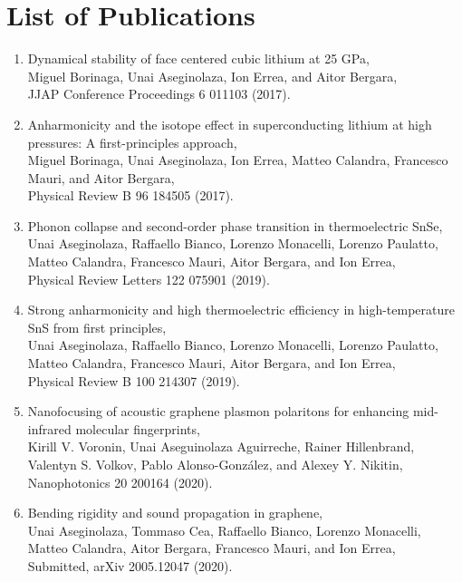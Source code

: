 
\chapter*{List of Publications} %

\begin{enumerate}
\item Dynamical stability of face centered cubic lithium at 25 GPa, \\
Miguel Borinaga, Unai Aseginolaza, Ion Errea, and Aitor Bergara, \\
JJAP Conference Proceedings 6 011103 (2017).
\item Anharmonicity and the isotope effect in superconducting lithium at high pressures: A first-principles 
approach, \\ Miguel Borinaga, Unai Aseginolaza, Ion Errea, Matteo Calandra, Francesco Mauri, and Aitor Bergara, \\
Physical Review B 96 184505 (2017).
\item Phonon collapse and second-order phase transition in thermoelectric SnSe, \\ Unai Aseginolaza, Raffaello 
Bianco, Lorenzo Monacelli, Lorenzo Paulatto, Matteo Calandra, Francesco Mauri, Aitor Bergara, and Ion Errea, \\
Physical Review Letters 122 075901 (2019).
\item Strong anharmonicity and high thermoelectric efficiency in high-temperature SnS from first principles, \\
Unai Aseginolaza, Raffaello Bianco, Lorenzo Monacelli, Lorenzo Paulatto, Matteo Calandra, Francesco Mauri, Aitor 
Bergara, and Ion Errea, \\ Physical Review B 100 214307 (2019).
\item Nanofocusing of acoustic graphene plasmon polaritons for enhancing mid-infrared molecular fingerprints, \\ 
Kirill V. Voronin, Unai Aseguinolaza Aguirreche, Rainer Hillenbrand, Valentyn S. Volkov, Pablo Alonso-González, and 
Alexey Y. Nikitin, \\ Nanophotonics 20 200164 (2020).
\item Bending rigidity and sound propagation in graphene, \\ Unai Aseginolaza, Tommaso 
Cea, Raffaello Bianco, Lorenzo Monacelli, Matteo Calandra, Aitor Bergara, Francesco Mauri, and Ion Errea, \\ 
Submitted, arXiv 2005.12047 (2020).
\end{enumerate}
